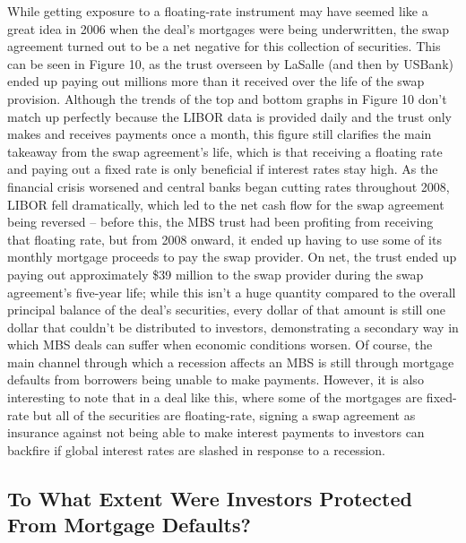 \documentclass[12pt]{article}
\begin{document}
While getting exposure to a floating-rate instrument may have seemed like a great idea in 2006 when the deal’s mortgages were being underwritten, the swap agreement turned out to be a net negative for this collection of securities. This can be seen in Figure 10, as the trust overseen by LaSalle (and then by USBank) ended up paying out millions more than it received over the life of the swap provision. Although the trends of the top and bottom graphs in Figure 10 don’t match up perfectly because the LIBOR data is provided daily and the trust only makes and receives payments once a month, this figure still clarifies the main takeaway from the swap agreement’s life, which is that receiving a floating rate and paying out a fixed rate is only beneficial if interest rates stay high. As the financial crisis worsened and central banks began cutting rates throughout 2008, LIBOR fell dramatically, which led to the net cash flow for the swap agreement being reversed – before this, the MBS trust had been profiting from receiving that floating rate, but from 2008 onward, it ended up having to use some of its monthly mortgage proceeds to pay the swap provider. On net, the trust ended up paying out approximately \$39 million to the swap provider during the swap agreement’s five-year life; while this isn’t a huge quantity compared to the overall principal balance of the deal’s securities, every dollar of that amount is still one dollar that couldn’t be distributed to investors, demonstrating a secondary way in which MBS deals can suffer when economic conditions worsen. Of course, the main channel through which a recession affects an MBS is still through mortgage defaults from borrowers being unable to make payments. However, it is also interesting to note that in a deal like this, where some of the mortgages are fixed-rate but all of the securities are floating-rate, signing a swap agreement as insurance against not being able to make interest payments to investors can backfire if global interest rates are slashed in response to a recession.


\subsection*{To What Extent Were Investors Protected From Mortgage Defaults?}
\end{document}
